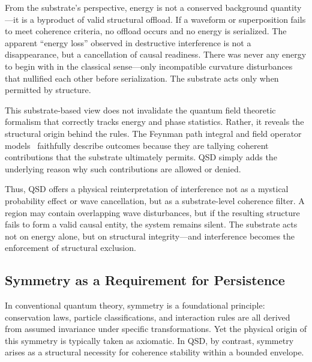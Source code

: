 \documentclass[entropy,article,submit,pdftex,moreauthors]{Definitions/mdpi}
\begin{document}
From the substrate’s perspective, energy is not a conserved background quantity—it is a byproduct of valid structural offload. If a waveform or superposition fails to meet coherence criteria, no offload occurs and no energy is serialized. The apparent “energy loss” observed in destructive interference is not a disappearance, but a cancellation of causal readiness. There was never any energy to begin with in the classical sense—only incompatible curvature disturbances that nullified each other before serialization. The substrate acts only when permitted by structure.

This substrate-based view does not invalidate the quantum field theoretic formalism that correctly tracks energy and phase statistics. Rather, it reveals the structural origin behind the rules. The Feynman path integral and field operator models~\cite{feynman-qed} faithfully describe outcomes because they are tallying coherent contributions that the substrate ultimately permits. QSD simply adds the underlying reason why such contributions are allowed or denied.

Thus, QSD offers a physical reinterpretation of interference not as a mystical probability effect or wave cancellation, but as a substrate-level coherence filter. A region may contain overlapping wave disturbances, but if the resulting structure fails to form a valid causal entity, the system remains silent. The substrate acts not on energy alone, but on structural integrity—and interference becomes the enforcement of structural exclusion.


\subsection{Symmetry as a Requirement for Persistence}

In conventional quantum theory, symmetry is a foundational principle: conservation laws, particle classifications, and interaction rules are all derived from assumed invariance under specific transformations. Yet the physical origin of this symmetry is typically taken as axiomatic. In QSD, by contrast, symmetry arises as a structural necessity for coherence stability within a bounded envelope.
\end{document}
